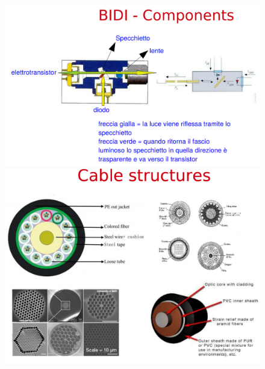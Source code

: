 \documentclass[8pt]{extarticle}
\begin{document}
\begin{figure}[H]
    \centering
    \begin{minipage}[c]{\linewidth}
        \begin{minipage}[l]{0.48\linewidth}
            \includegraphics[width=\linewidth]{images/FO13.png}
        \end{minipage}
        \hspace{0.04\linewidth}
        \begin{minipage}[l]{0.48\linewidth}
            \includegraphics[width=\linewidth]{images/FO14.png}
        \end{minipage}
    \end{minipage}
\end{figure}
\end{document}
